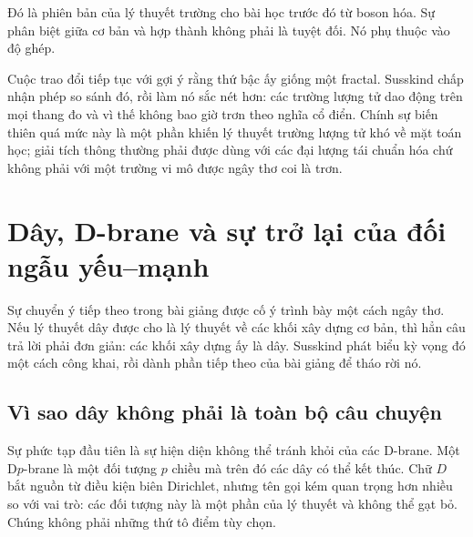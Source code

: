Đó là phiên bản của lý thuyết trường cho bài học trước đó từ boson hóa. Sự phân biệt giữa cơ bản và hợp thành không phải là tuyệt đối. Nó phụ thuộc vào độ ghép.

\begin{classroomqa}
\end{classroomqa}

Cuộc trao đổi tiếp tục với gợi ý rằng thứ bậc ấy giống một fractal. Susskind chấp nhận phép so sánh đó, rồi làm nó sắc nét hơn: các trường lượng tử dao động trên mọi thang đo và vì thế không bao giờ trơn theo nghĩa cổ điển. Chính sự biến thiên quá mức này là một phần khiến lý thuyết trường lượng tử khó về mặt toán học; giải tích thông thường phải được dùng với các đại lượng tái chuẩn hóa chứ không phải với một trường vi mô được ngây thơ coi là trơn.

\section{Dây, D-brane và sự trở lại của đối ngẫu yếu--mạnh}

Sự chuyển ý tiếp theo trong bài giảng được cố ý trình bày một cách ngây thơ. Nếu lý thuyết dây được cho là lý thuyết về các khối xây dựng cơ bản, thì hẳn câu trả lời phải đơn giản: các khối xây dựng ấy là dây. Susskind phát biểu kỳ vọng đó một cách công khai, rồi dành phần tiếp theo của bài giảng để tháo rời nó.

\subsection{Vì sao dây không phải là toàn bộ câu chuyện}

Sự phức tạp đầu tiên là sự hiện diện không thể tránh khỏi của các D-brane. Một D\(p\)-brane là một đối tượng \(p\) chiều mà trên đó các dây có thể kết thúc. Chữ \(D\) bắt nguồn từ điều kiện biên Dirichlet, nhưng tên gọi kém quan trọng hơn nhiều so với vai trò: các đối tượng này là một phần của lý thuyết và không thể gạt bỏ. Chúng không phải những thứ tô điểm tùy chọn.

